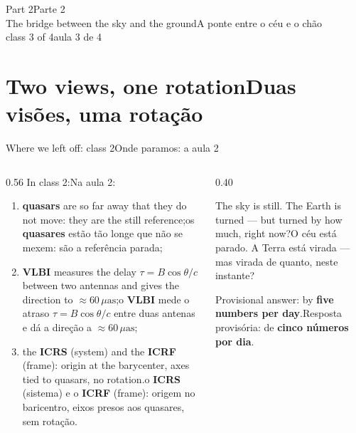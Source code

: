 \documentclass[aspectratio=169,11pt]{beamer}
\newcommand{\tr}[2]{\ifEN#2\else#1\fi}
\newcommand{\bnum}[1]{\textbf{\textcolor{mTeal}{#1}}}
\newcommand{\sist}[1]{\textcolor{corSist}{\textbf{#1}}}
\newcommand{\fram}[1]{\textcolor{corFrame}{\textbf{#1}}}
\newcommand{\uas}{\ensuremath{\,\mu\mathrm{as}}\xspace}
\begin{document}
\begin{frame}[standout]
  \tr{Parte 2}{Part 2}\\[6pt]
  {\normalsize \tr{A ponte entre o céu e o chão}{The bridge between the sky and the ground}}\\[4pt]
  {\scriptsize \tr{aula 3 de 4}{class 3 of 4}}
\end{frame}

\section{\tr{Duas visões, uma rotação}{Two views, one rotation}}

\begin{frame}{\tr{Onde paramos: a aula 2}{Where we left off: class 2}}
  \begin{columns}[T]
    \begin{column}{0.56\textwidth}
      \small
      \tr{Na aula 2:}{In class 2:}
      \begin{enumerate}
        \setlength{\itemsep}{4pt}
        \item \tr{os \bnum{quasares} estão tão longe que não se mexem: são a referência parada;}{\bnum{quasars} are so far away that they do not move: they are the still reference;}
        \item \tr{o \bnum{VLBI} mede o atraso $\tau = B\cos\theta/c$ entre duas antenas e dá a direção a $\approx 60\uas$;}{\bnum{VLBI} measures the delay $\tau = B\cos\theta/c$ between two antennas and gives the direction to $\approx 60\uas$;}
        \item \tr{o \sist{ICRS} (sistema) e o \fram{ICRF} (frame): origem no baricentro, eixos presos aos quasares, sem rotação.}{the \sist{ICRS} (system) and the \fram{ICRF} (frame): origin at the barycenter, axes tied to quasars, no rotation.}
      \end{enumerate}
    \end{column}
    \begin{column}{0.40\textwidth}
      \begin{cuidado}[title={\tr{A pergunta de hoje}{Today's question}}]
        \tr{O céu está parado. A Terra está \alert{virada} --- mas virada de quanto, \alert{neste instante}?}{The sky is still. The Earth is \alert{turned} --- but turned by how much, \alert{right now}?}
        \medskip

        \tr{Resposta provisória: de \bnum{cinco números por dia}.}{Provisional answer: by \bnum{five numbers per day}.}
      \end{cuidado}
    \end{column}
  \end{columns}
\end{frame}
\end{document}
